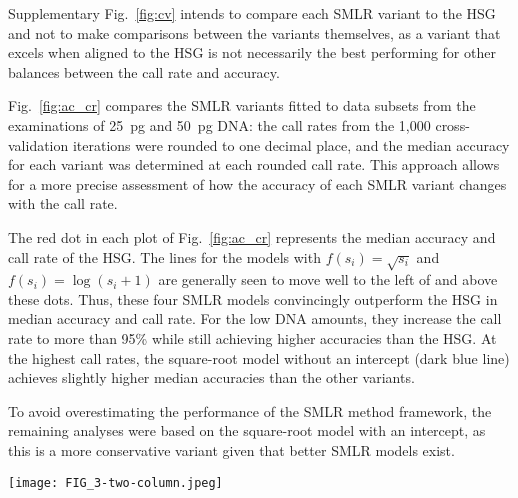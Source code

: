 \documentclass[preprint,5p,times,11pt]{elsarticle}
\begin{document}
Supplementary Fig.~\ref{fig:cv} intends to compare each SMLR variant to the HSG and not to make comparisons between the variants themselves, as a variant that excels when aligned to the HSG is not necessarily the best performing for other balances between the call rate and accuracy.

Fig.~\ref{fig:ac_cr} compares the SMLR variants fitted to data subsets from the examinations of \SI{25}{\pg} and \SI{50}{\pg} DNA:
the call rates from the 1,000 cross-validation iterations were rounded to one decimal place, and the median accuracy for each variant was determined at each rounded call rate.
This approach allows for a more precise assessment of how the accuracy of each SMLR variant changes with the call rate.

The red dot in each plot of Fig.~\ref{fig:ac_cr} represents the median accuracy and call rate of the HSG.
The lines for the models with $f\left(s_i\right) = \sqrt{s_i}$ and $f\left(s_i\right) = \log\left(s_i+1\right)$ are generally seen to move well to the left of and above these dots.
Thus, these four SMLR models convincingly outperform the HSG in median accuracy and call rate.
For the low DNA amounts, they increase the call rate to more than 95\% while still achieving higher accuracies than the HSG.
At the highest call rates, the square-root model without an intercept (dark blue line) achieves slightly higher median accuracies than the other variants.

To avoid overestimating the performance of the SMLR method framework, the remaining analyses were based on the square-root model with an intercept, as this is a more conservative variant given that better SMLR models exist.
\begin{figure*}
\centering
\texttt{[image: FIG\_3-two-column.jpeg]}
\caption{
Median accuracy versus call rate from aggregated results of cross-validations (legend applies to both plots).\\
Each line represents the median accuracies calculated from binned call rate data of 1,000 cross-validation iterations, where the six SMLR models were fitted to and tested on data from the examinations of the DNA quantities indicated above the plots.
The red dot in each plot shows the median accuracy and call rate for the HID SNP Genotyper Plugin.
Note that the two plots use different axes scales, and that the first axes have been reversed to align with Fig.~\ref{fig:accr_vs_q_low}, where increasing $q$ leads to decreasing call rates.
}
\label{fig:ac_cr}
\end{figure*}
\end{document}
